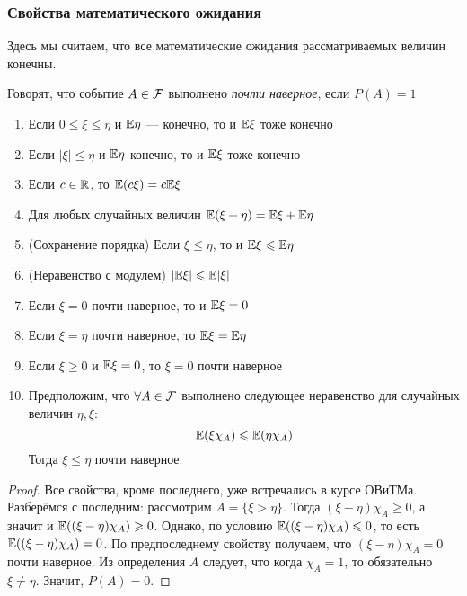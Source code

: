 \subsubsection*{Свойства математического ожидания}

\begin{note}
	Здесь мы считаем, что все математические ожидания рассматриваемых величин конечны.
\end{note}

\begin{definition}
	Говорят, что событие $A \in \mathcal{F}$ выполнено \textit{почти наверное}, если $P(A) = 1$
\end{definition}

\begin{enumerate}
	\item Если $0 \le \xi \le \eta$ и $\mathbb{E}\eta$ --- конечно, то и $\mathbb{E}\xi$ тоже конечно
	
	\item Если $|\xi| \le \eta$ и $\mathbb{E}\eta$ конечно, то и $\mathbb{E}\xi$ тоже конечно
	
	\item Если $c \in \mathbb{R}$, то $\mathbb{E}(c\xi) = c\mathbb{E}\xi$
	
	\item Для любых случайных величин $\mathbb{E}(\xi + \eta) = \mathbb{E}\xi + \mathbb{E}\eta$
	
	\item (Сохранение порядка) Если $\xi \le \eta$, то и $\mathbb{E}\xi \leqslant \mathbb{E}\eta$
	
	\item (Неравенство с модулем) $|\mathbb{E}\xi| \leqslant \mathbb{E}|\xi|$
	
	\item Если $\xi = 0$ почти наверное, то и $\mathbb{E}\xi = 0$
	
	\item Если $\xi = \eta$ почти наверное, то $\mathbb{E}\xi = \mathbb{E}\eta$
	
	\item Если $\xi \ge 0$ и $\mathbb{E}\xi = 0$, то $\xi = 0$ почти наверное
	
	\item Предположим, что $\forall A \in \mathcal{F}$ выполнено следующее неравенство для случайных величин $\eta, \xi$:
	\[
		\mathbb{E}(\xi\chi_A) \leqslant \mathbb{E}(\eta\chi_A)
	\]
	Тогда $\xi \le \eta$ почти наверное.
\end{enumerate}

\begin{proof}
	Все свойства, кроме последнего, уже встречались в курсе ОВиТМа. Разберёмся с последним: рассмотрим $A = \{\xi > \eta\}$. Тогда $(\xi - \eta)\chi_A \ge 0$, а значит и $\mathbb{E}((\xi - \eta)\chi_A) \geqslant 0$. Однако, по условию $\mathbb{E}((\xi - \eta)\chi_A) \leqslant 0$, то есть $\mathbb{E}((\xi - \eta)\chi_A) = 0$. По предпоследнему свойству получаем, что $(\xi - \eta)\chi_A = 0$ почти наверное. Из определения $A$ следует, что когда $\chi_A = 1$, то обязательно $\xi \neq \eta$. Значит, $P(A) = 0$.
\end{proof}

